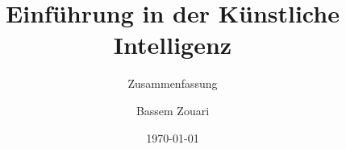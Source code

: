\documentclass[
    ngerman,
    color=11b,
    loadcommon, %
    summary,
    boxarc,
    main,
]{rubos-tuda-template}
\title[EIKI]{Einführung in der Künstliche Intelligenz}
\subtitle{Zusammenfassung}
\author{Bassem Zouari}
\date{\today}
\begin{document}
\maketitle{}
\tableofcontents %
\clearpage

%    

\clearpage

\clearpage

\clearpage

\clearpage

\end{document}
